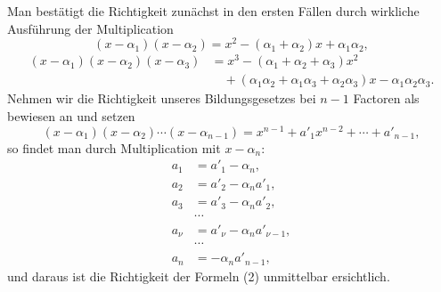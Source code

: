 \documentclass[11pt]{article}
\begin{document}
Man bestätigt die Richtigkeit zunächst in den ersten Fällen durch wirkliche Ausführung der Multiplication
\[
 (x-\alpha_1)(x-\alpha_2)=x^2-(\alpha_1+\alpha_2)x+\alpha_1\alpha_2,
\]
\[
\begin{aligned}
 (x-\alpha_1)(x-\alpha_2)(x-\alpha_3)&=x^3-(\alpha_1+\alpha_2+\alpha_3)x^2\\
&\quad +(\alpha_1\alpha_2+\alpha_1\alpha_3+\alpha_2\alpha_3)x-\alpha_1\alpha_2\alpha_3.
\end{aligned}
\]
Nehmen wir die Richtigkeit unseres Bildungsgesetzes bei $n-1$ Factoren als bewiesen an und setzen
\[
 (x-\alpha_1)(x-\alpha_2)\cdots(x-\alpha_{n-1})=x^{n-1}+a'_1x^{n-2}+\cdots+a'_{n-1},
\]
so findet man durch Multiplication mit $x-\alpha_n$:
\begin{equation}
\begin{aligned}
 a_1&=a'_1-\alpha_n,\\
 a_2&=a'_2-\alpha_n a'_1,\\
 a_3&=a'_3-\alpha_n a'_2,\\
&\cdots\\
 a_\nu&=a'_\nu-\alpha_n a'_{\nu-1},\\
&\cdots\\
 a_n&=-\alpha_n a'_{n-1},
\end{aligned}
\tag{3}
\end{equation}
und daraus ist die Richtigkeit der Formeln (2) unmittelbar ersichtlich.
\end{document}
